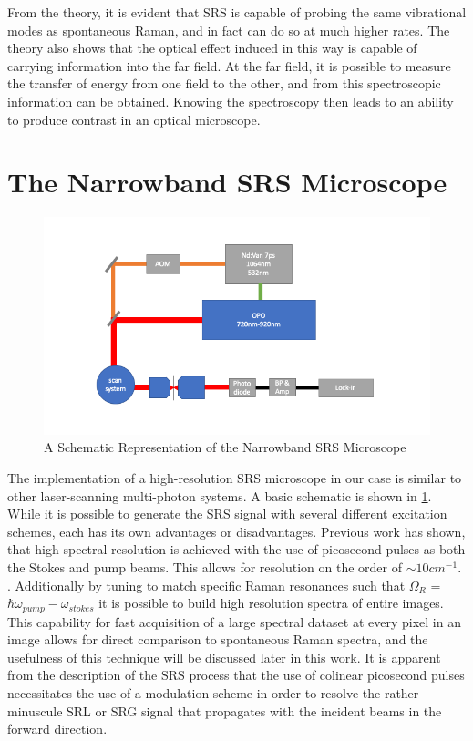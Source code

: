 From the theory, it is evident that SRS is capable of probing the same vibrational modes as spontaneous Raman, and in fact can do so at much higher rates.  The theory also shows that the optical effect induced in this way is capable of carrying information into the far field. At the far field, it is possible to measure the transfer of energy from one field to the other, and from this spectroscopic information can be obtained.  Knowing the spectroscopy then leads to an ability to produce contrast in an optical microscope.  

\section{The Narrowband SRS Microscope}
\begin{figure}[h]
    \centering
    \includegraphics[width=.9\textwidth]{Figures/Slide1.png}
    \caption{A Schematic Representation of the Narrowband SRS Microscope \label{scope}}
\end{figure}
The implementation of a high-resolution SRS microscope in our case is similar to other laser-scanning multi-photon systems.  A basic schematic is shown in \ref{scope}.  While it is possible to generate the SRS signal with several different excitation schemes, each has its own advantages or disadvantages.  Previous work has shown, that high spectral resolution is achieved with the use of picosecond pulses as both the Stokes and pump beams.  This allows for resolution on the order of $\sim10cm^{-1}$.  . Additionally by tuning to match specific Raman resonances such that $\Omega_R$ = $\hbar\omega_{pump}-\omega_{stokes}$ it is possible to build high resolution spectra of entire images. This capability for fast acquisition of a large spectral dataset at every pixel in an image allows for direct comparison to spontaneous Raman spectra, and the usefulness of this technique will be discussed later in this work. It is apparent from the description of the SRS process that the use of colinear picosecond pulses necessitates the use of a modulation scheme in order to resolve the rather minuscule SRL or SRG signal that propagates with the incident beams in the forward direction.

